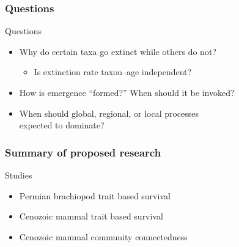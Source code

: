 \documentclass{beamer}
\begin{document}
\begin{frame}
  \frametitle{Questions}

  \begin{alertblock}{Questions}
    \begin{itemize}
      \item Why do certain taxa go extinct while others do not?
        \begin{itemize}
          \item Is extinction rate taxon--age independent?
        \end{itemize}
      \item How is emergence ``formed?'' When should it be invoked?
      \item When should global, regional, or local processes \\expected to dominate?
    \end{itemize}
  \end{alertblock}
\end{frame}

\begin{frame}
  \frametitle{Summary of proposed research}

  \begin{alertblock}{Studies}
    \begin{itemize}
      \item Permian brachiopod trait based survival %
      \item Cenozoic mammal trait based survival %
      \item Cenozoic mammal community connectedness %
    \end{itemize}
  \end{alertblock}

\end{frame}
\end{document}
